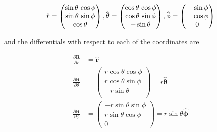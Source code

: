 \begin{equation}
	\mathbf{\hat{\text{$r$}}} =
	\begin{pmatrix}
		\sin\theta \, \cos\phi \\
		\sin\theta \, \sin\phi \\
		\cos\theta             \\
	\end{pmatrix},
	\mathbf{\hat{\text{$\theta$}}} =
	\begin{pmatrix}
		\cos\theta \, \cos\phi \\
		\cos\theta \, \sin\phi \\
		- \sin\theta           \\
	\end{pmatrix},
	\mathbf{\hat{\text{$\phi$}}} =
	\begin{pmatrix}
		- \, \sin\phi            \\
		\hphantom{-} \, \cos\phi \\
		0                        \\
	\end{pmatrix}
\end{equation}

and the differentials with respect to each of the coordinates are

\begin{equation}
	\begin{aligned}
		\frac{\partial\mathbf{R}}{\partial r}      & = \mathbf{\hat{\text{$r$}}} \\
		\frac{\partial\mathbf{R}}{\partial \theta} & =
		\begin{pmatrix}
			r \cos\theta  \cos\phi \\
			r \cos\theta  \sin\phi \\
			-r \sin\theta          \\
		\end{pmatrix}
		=r\mathbf{\hat{\text{$\theta$}}}                                         \\
		\frac{\partial\mathbf{R}}{\partial \phi}   & =
		\begin{pmatrix}
			-r \sin\theta  \sin\phi \\
			r \sin\theta  \cos\phi  \\
			0
		\end{pmatrix}
		= r \sin\theta \mathbf{\hat{\text{$\phi$}}}
	\end{aligned}
\end{equation}

